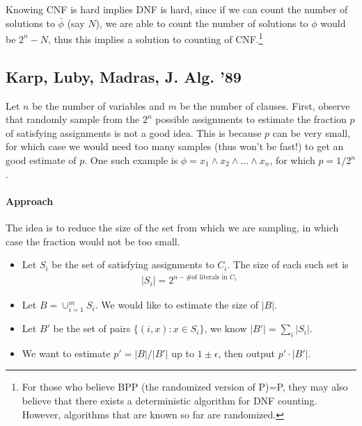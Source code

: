 \documentclass[11pt]{article}
\newcommand{\kibitz}[2]{\ifnum\Comments=1{\color{#1}{#2}}\fi}
\newcommand{\hma}[1]{\kibitz{blue}{[HONGYAO: #1]}}
\theoremstyle{definition}
\theoremstyle{remark}
\begin{document}
Knowing CNF is hard implies DNF is hard, since if we can count the number of solutions to $\bar{\phi}$ (say $N$), we are able to count the number of solutions to $\phi$ would be $2^n - N$, thus this implies a solution to counting of CNF.\footnote{For those who believe BPP (the randomized version of P)=P, they may also believe that there exists a deterministic algorithm for DNF counting. However, algorithms that are known so far are randomized.}

\subsection{Karp, Luby, Madras, J. Alg. '89 \cite{KarpLM89}}

Let $n$ be the number of variables and $m$ be the number of clauses. First, observe that randomly sample from the $2^n$ possible assignments to estimate the fraction $p$ of satisfying assignments is not a good idea. This is because $p$ can be very small, for which case we would need too many samples (thus won't be fast!) to get an good estimate of $p$. One such example is  $\phi = x_1 \wedge x_2 \wedge \dots \wedge x_n$, for which $p = 1/2^n$.

\paragraph{Approach} The idea is to reduce the size of the set from which we are sampling, in which case the fraction would not be too small.

\begin{itemize}
	\item Let $S_i$ be the set of satisfying assignments to $C_i$. The size of each such set is 
	\begin{align*}
		|S_i| = 2^{n - \text{\# of literals in }C_i}
	\end{align*}
	\item Let $B  = \cup_{i=1}^m S_i$. We would like to estimate the size of $|B|$.
	\item Let $B'$ be the set of pairs $\{(i,x): x \in S_i \}$, we know $|B'| = \sum_{i} |S_i|$.
	\item We want to estimate $p' = |B| / |B'|$ up to $1 \pm \epsilon$, then output $p' \cdot |B'|$. 
\end{itemize}

\hma{I was a bit confused about how accurate do we need to estimate $p'$, and think we may need a bit more of comment here? Is the objective of the DNF counting problem to estimate $p$ up to $1 \pm \epsilon$? If we estimate $p'$ up to $1\pm \epsilon$, the estimation of $p = p'|B'|/2^n$ can be off by at most $\epsilon |B'|/2^n$--- does this mean in the following bound, we can use $\epsilon 2^n/|B'|$ instead of $\epsilon$? 

Another issue is that for the case when $|B'|> 2^n$ where this $B'$ trick is useless, the estimation for $p$ would be off by more than $\epsilon$...}
\end{document}
